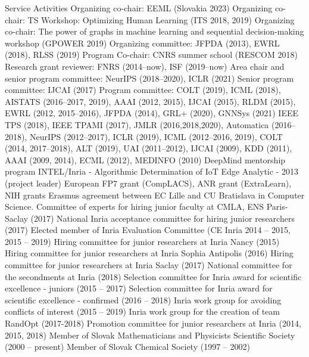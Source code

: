 \documentclass{resume}
\begin{document}
\begin{category}{Service Activities}
\citembullet Organizing co-chair: EEML (Slovakia 2023)
\citembullet Organizing co-chair: TS Workshop: Optimizing Human Learning (ITS 2018, 2019)
\citembullet Organizing co-chair: The power of graphs in machine learning and sequential decision-making workshop (GPOWER 2019)
\citembullet Organizing committee: JFPDA (2013), EWRL (2018), RLSS (2019)
\citembullet Program Co-chair: CNRS summer school (RESCOM 2018)
\citembullet Research grant reviewer: FNRS (2014--now), ISF (2019--now)
\citembullet Area chair and senior program committee:  NeurIPS (2018--2020), ICLR  (2021)
\citembullet Senior program committee:  IJCAI (2017)
\citembullet Program committee: COLT (2019), ICML (2018), AISTATS (2016--2017, 2019), AAAI (2012, 2015), IJCAI (2015), RLDM (2015), EWRL 
(2012, 2015--2016), JFPDA (2014), GRL+ (2020), GNNSys (2021)
\citembullet  IEEE TPS (2018), IEEE TPAMI (2017), JMLR (2016,2018,2020), Automatica (2016--2018), NeurIPS (2012--2017), ICLR (2019), ICML (2012--2016, 2019), COLT
(2014, 2017--2018), ALT (2019), UAI (2011--2012), IJCAI (2009), KDD (2011), AAAI (2009, 2014), ECML
(2012), MEDINFO (2010)
\citembullet DeepMind mentorship program
\citembullet INTEL/Inria - Algorithmic Determination of IoT Edge Analytic -
2013 (project leader)
\citembullet  European FP7 grant (CompLACS), ANR grant (ExtraLearn), NIH grants
\citembullet Erasmus agreement between EC Lille and CU Bratislava in Computer
Science.
\citembullet Committee of experts for hiring junior faculty at CMLA, ENS Paris-Saclay  (2017)
\citembullet National Inria acceptance committee for hiring junior researchers (2017)
\citembullet Elected member of Inria Evaluation Committee (CE Inria 2014 -- 2015, 2015 -- 2019)
\citembullet Hiring committee for junior researchers at Inria Nancy (2015)
\citembullet Hiring committee for junior researchers at Inria Sophia Antipolis (2016)
\citembullet Hiring committee for junior researchers at Inria Saclay (2017)
\citembullet National committee for the secondments at Inria (2018)
\citembullet Selection committee for Inria award for scientific excellence - juniors (2015 -- 2017)
\citembullet Selection committee for Inria award for scientific excellence - confirmed (2016 -- 2018)
\citembullet Inria work group for avoiding conflicts of interest (2015 -- 2019)
\citembullet Inria work group for the creation of team RandOpt (2017-2018)
\citembullet Promotion committee for junior researchers at Inria (2014, 2015, 2018)
\citembullet Member of Slovak Mathematicians and Physicists Scientific Society 
(2000 -- present)
\citembullet Member of Slovak Chemical Society (1997 -- 2002)
\end{category}
\end{document}
